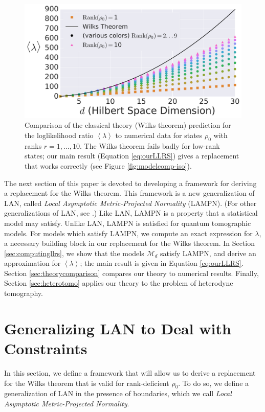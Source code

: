 \documentclass[aps,pra, twocolumn]{revtex4-1}
\newcommand{\M}{\mathcal{M}}
\newcommand{\expect}[1]{\ensuremath{\left\langle#1\right\rangle}}
\begin{document}
\begin{figure}
\includegraphics[width=\columnwidth]{Images/Figure_2A.pdf}
 \caption{Comparison of the classical theory (Wilks theorem) prediction for the loglikelihood ratio $\expect{\lambda}$ to numerical data for states $\rho_{0}$ with ranks $r=1,\ldots ,10$.  The Wilks theorem fails badly for low-rank states; our main result (Equation \ref{eq:ourLLRS}) gives a replacement that works correctly (see Figure \ref{fig:modelcomp-iso}).}
\label{fig:boundaries2}
\end{figure}

The next section of this paper is devoted to developing a framework for deriving a replacement for the Wilks theorem. This framework is a new generalization of LAN, called \emph{Local Asymptotic Metric-Projected Normality} (LAMPN). (For other generalizations of LAN, see \cite{Roussas2010, Jeganathan1982}.) Like LAN, LAMPN is a property that a statistical model may satisfy. Unlike LAN, LAMPN is satisfied for quantum tomographic models. For models which satisfy LAMPN, we compute an exact expression for $\lambda$, a necessary building block in our replacement for the Wilks theorem. In Section \ref{sec:computingllrs}, we show that the models $\M_{d}$ satisfy LAMPN, and derive an approximation for $\expect{\lambda}$; the main result is given in Equation \eqref{eq:ourLLRS}.  Section \ref{sec:theorycomparison} compares our theory to numerical results. Finally, Section \ref{sec:heterotomo} applies our theory to the problem of heterodyne tomography.

\section{Generalizing LAN to Deal with Constraints}
\label{sec:wilksreplacement}

In this section, we define a framework that will allow us to derive a replacement for the Wilks theorem that is valid for rank-deficient $\rho_{0}$. To do so, we define a generalization of LAN in the presence of boundaries, which we call \emph{Local Asymptotic Metric-Projected Normality}.
\end{document}
